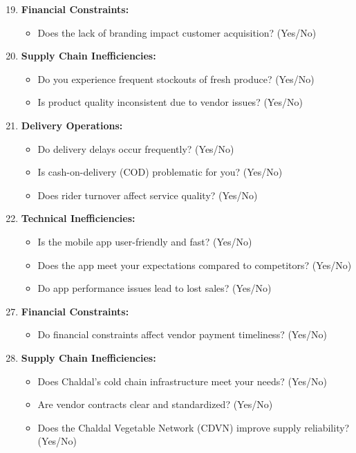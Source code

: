 \documentclass[12pt,a4paper]{article}
\begin{document}
\begin{enumerate}
    \setcounter{enumi}{18}
    \item \textbf{Financial Constraints:}
    \begin{itemize}
        \item Does the lack of branding impact customer acquisition? (Yes/No)
    \end{itemize}
    \item \textbf{Supply Chain Inefficiencies:}
    \begin{itemize}
        \item Do you experience frequent stockouts of fresh produce? (Yes/No)
        \item Is product quality inconsistent due to vendor issues? (Yes/No)
    \end{itemize}
    \item \textbf{Delivery Operations:}
    \begin{itemize}
        \item Do delivery delays occur frequently? (Yes/No)
        \item Is cash-on-delivery (COD) problematic for you? (Yes/No)
        \item Does rider turnover affect service quality? (Yes/No)
    \end{itemize}
    \item \textbf{Technical Inefficiencies:}
    \begin{itemize}
        \item Is the mobile app user-friendly and fast? (Yes/No)
        \item Does the app meet your expectations compared to competitors? (Yes/No)
        \item Do app performance issues lead to lost sales? (Yes/No)
    \end{itemize}
\end{enumerate}

\begin{enumerate}
    \setcounter{enumi}{26}
    \item \textbf{Financial Constraints:}
    \begin{itemize}
        \item Do financial constraints affect vendor payment timeliness? (Yes/No)
    \end{itemize}
    \item \textbf{Supply Chain Inefficiencies:}
    \begin{itemize}
        \item Does Chaldal’s cold chain infrastructure meet your needs? (Yes/No)
        \item Are vendor contracts clear and standardized? (Yes/No)
        \item Does the Chaldal Vegetable Network (CDVN) improve supply reliability? (Yes/No)
    \end{itemize}
\end{enumerate}
\end{document}
